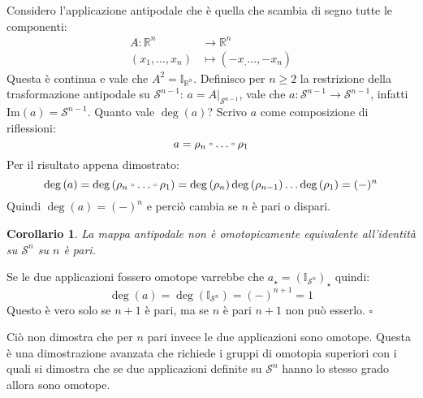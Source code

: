 \documentclass[10pt, twoside=false, x11names]{scrbook}
\newtheorem{lemma}[theorem]{Lemma}
\newtheorem{corollary}[theorem]{Corollario}
\newenvironment{proof}{{\textbf{Dimostrazione}:}}{\hfill $\square$}
\newcommand{\im}[1]{\mathrm{Im}( #1 )}
\newcommand{\RN}[1][]{\mathbb{R}^#1}
\newcommand{\Id}[1][]{\mathbb{I}_#1}
\newcommand{\Sph}[1][]{\mathcal{S}^#1}
\let\latexcirc=\circ
\newcommand{\ccirc}{\mathbin{\mathchoice
  {\xcirc\scriptstyle}
  {\xcirc\scriptstyle}
  {\xcirc\scriptscriptstyle}
  {\xcirc\scriptscriptstyle}
}}
\newcommand{\xcirc}[1]{\vcenter{\hbox{$#1\latexcirc$}}}
\let\circ\ccirc
\begin{document}

Considero l'applicazione antipodale che è quella che scambia di segno tutte le componenti:
\begin{align*}
  A \colon \RN{n} & \to \RN{n} \\
  (x_1, \dots, x_{n}) & \mapsto (-x_, \dots, -x_n)
\end{align*}
Questa è continua e vale che $ A^2 = \Id{\RN{n}}$. Definisco per $ n \geq 2 $ la restrizione della trasformazione
antipodale su $ \Sph{n-1} $: $ a = A \lvert_{\Sph{n-1}} $, vale che $ a \colon \Sph{n-1} \to \Sph{n-1} $, infatti
$ \im{a} = \Sph{n-1} $. Quanto vale $ \deg{(a)} $?
Scrivo $ a $ come composizione di riflessioni:
\[
  a = \rho_n \circ \dots \circ \rho_1
\]
Per il risultato appena dimostrato:
\[
  \deg{(a)} = \deg{(\rho_n \circ \dots \circ \rho_1)} = \deg{(\rho_n)}\deg{(\rho_{n-1})}\dots\deg{(\rho_1)} = (-)^n
\]
Quindi $ \deg{(a)} = (-)^n $ e perciò cambia se $ n $ è pari o dispari.

\begin{corollary}
  La mappa antipodale non è omotopicamente equivalente all'identità su $ \Sph{n} $ su $ n $ è pari.
\end{corollary}
\begin{proof}
  Se le due applicazioni fossero omotope varrebbe che $ a_\star = (\Id{\Sph{n}})_\star $ quindi:
  \[
    \deg{(a)} = \deg{(\Id{\Sph{n}})} = (-)^{n+1} = 1
  \]
  Questo è vero solo se $ n + 1 $ è pari, ma se $ n $ è pari $ n + 1 $ non può esserlo.
\end{proof}

Ciò non dimostra che per $ n $ pari invece le due applicazioni sono omotope. Questa è una
dimostrazione avanzata che richiede i gruppi di omotopia superiori con i quali si dimostra
che se due applicazioni definite su $ \Sph{n} $ hanno lo stesso grado allora sono omotope.
\end{document}
